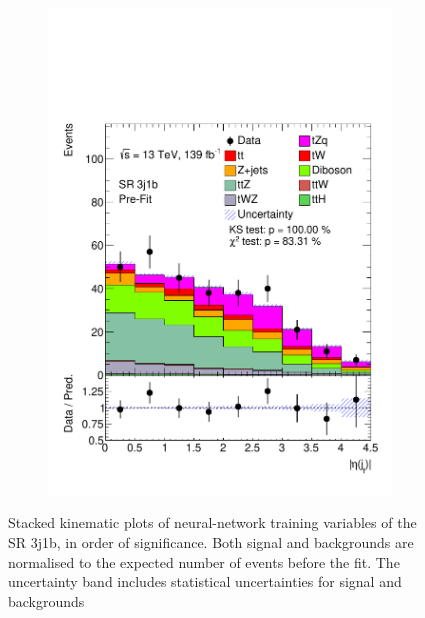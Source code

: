 \begin{figure}[!h]
\begin{subfigure}[b]{0.33\linewidth}
    \includegraphics[width=\linewidth]{ubonn-thesis/Chapters/Chapters_06/Figure/Input_distribution/SR_3j1b_forwardjet_eta.pdf} 
  \end{subfigure} 
   \caption{Stacked kinematic plots of neural-network training variables of the SR 3j1b, in order of significance. Both signal and backgrounds are normalised to the expected number of events before the fit. The uncertainty band includes statistical uncertainties for signal and backgrounds}
  \label{fig_signal4} 
\end{figure}


